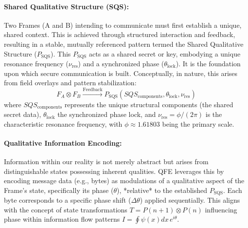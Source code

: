 \documentclass[11pt]{article}
\newcommand{\phiConst}{\phi} %
\newcommand{\piConst}{\pi}   %
\newcommand{\eConst}{e}      %
\newcommand{\iConst}{i}      %
\newcommand{\SQS}{P_{\text{SQS}}}        %
\newcommand{\SQScomp}{SQS_{\text{components}}} %
\newcommand{\SQSphase}{\theta_{\text{lock}}} %
\newcommand{\SQSres}{\nu_{\text{res}}}     %
\begin{document}
	\paragraph{Shared Qualitative Structure (SQS):} Two Frames (A and B) intending to communicate must first establish a unique, shared context. This is achieved through structured interaction and feedback, resulting in a stable, mutually referenced pattern termed the Shared Qualitative Structure ($\SQS$). This $\SQS$ acts as a shared secret or key, embodying a unique resonance frequency ($\SQSres$) and a synchronized phase ($\SQSphase$). It is the foundation upon which secure communication is built. Conceptually, in nature, this arises from field overlays and pattern stabilization:
	\begin{equation}
		F_A \otimes F_B \xrightarrow{\text{Feedback}} \SQS(\SQScomp, \SQSphase, \SQSres)
	\end{equation}
	where $\SQScomp$ represents the unique structural components (the shared secret data), $\SQSphase$ the synchronized phase lock, and $\SQSres = \phiConst / (2\piConst)$ is the characteristic resonance frequency, with $\phiConst \approx 1.61803$ being the primary scale.
	
	\paragraph{Qualitative Information Encoding:} Information within our reality is not merely abstract but arises from distinguishable states possessing inherent qualities. QFE leverages this by encoding message data (e.g., bytes) as modulations of a qualitative aspect of the Frame's state, specifically its phase ($\theta$), *relative* to the established $\SQS$. Each byte corresponds to a specific phase shift ($\Delta\theta$) applied sequentially. This aligns with the concept of state transformations $T = P(n+1) \otimes P(n)$ influencing phase within information flow patterns $I = \oint \psi(x)dx \, \eConst^{\iConst\theta}$.
	
\end{document}
